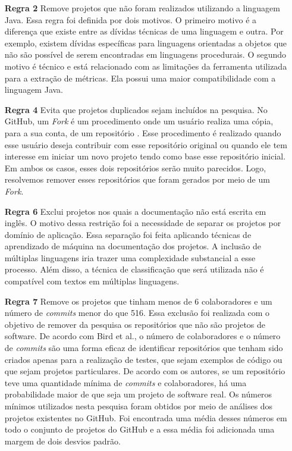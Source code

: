 \begin{itemize}
\item[\textbf{Regra 2}] Remove projetos que não foram realizados utilizando a linguagem Java. Essa regra foi definida por dois motivos. O primeiro motivo é a diferença que existe entre as dívidas técnicas de uma linguagem e outra. Por exemplo, existem dívidas específicas para linguagens orientadas a objetos que não são possível de serem encontradas em linguagens procedurais. O segundo motivo é técnico e está relacionado com as limitações da ferramenta utilizada para a extração de métricas. Ela possui uma maior compatibilidade com a linguagem Java.
\item[\textbf{Regra 4}] Evita que projetos duplicados sejam incluídos na pesquisa. No GitHub, um \textit{Fork} é um procedimento onde um usuário realiza uma cópia, para a sua conta, de um repositório \cite{thung2013network}. Esse procedimento é realizado quando esse usuário deseja contribuir com esse repositório original ou quando ele tem interesse em iniciar um novo projeto tendo como base esse repositório inicial. Em ambos os casos, esses dois repositórios serão muito parecidos. Logo, resolvemos remover esses repositórios que foram gerados por meio de um \textit{Fork}.
\item[\textbf{Regra 6}] Exclui projetos nos quais a documentação não está escrita em inglês. O motivo dessa restrição foi a necessidade de separar os projetos por domínio de aplicação. Essa separação foi feita aplicando técnicas de aprendizado de máquina  na documentação dos projetos.  A inclusão de múltiplas linguagens iria trazer uma complexidade substancial a esse processo. Além disso, a técnica de classificação que será utilizada não é compatível com textos em múltiplas linguagens.
\item[\textbf{Regra 7}] Remove os projetos que tinham menos de 6 colaboradores e um número de \textit{commits} menor do que 516. Essa exclusão foi realizada com o objetivo de remover da pesquisa os repositórios que não são projetos de software. De acordo com Bird et al.\cite{bird2009promises}, o número de colaboradores e o número de \textit{commits} são uma forma eficaz de identificar repositórios que tenham sido criados apenas para a realização de testes, que sejam exemplos de código ou que sejam projetos particulares. De acordo com os autores,  se um repositório teve uma quantidade mínima de \textit{commits} e colaboradores, há uma probabilidade maior de que seja um projeto de software real. Os números mínimos utilizados nesta pesquisa foram obtidos por meio de análises dos projetos existentes no GitHub. Foi encontrada uma média desses números em todo o conjunto de projetos do GitHub e a essa média foi adicionada uma margem de dois desvios padrão. 

\end{itemize}
